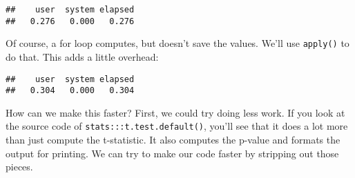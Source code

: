 \begin{verbatim}
##    user  system elapsed 
##   0.276   0.000   0.276
\end{verbatim}

Of course, a for loop computes, but doesn't save the values. We'll use
\texttt{apply()} to do that. This adds a little overhead:

\begin{Shaded}
\begin{Highlighting}[]
\StringTok{ }
  \NormalTok{(x[grp }\OperatorTok{==}\StringTok{ }\NormalTok{], x[grp }\OperatorTok{==}\StringTok{ }\NormalTok{])}\OperatorTok{$}
\NormalTok{\}}
\StringTok{ }
\end{Highlighting}
\end{Shaded}

\begin{verbatim}
##    user  system elapsed 
##   0.304   0.000   0.304
\end{verbatim}

How can we make this faster? First, we could try doing less work. If you
look at the source code of \texttt{stats:::t.test.default()}, you'll see
that it does a lot more than just compute the t-statistic. It also
computes the p-value and formats the output for printing. We can try to
make our code faster by stripping out those pieces.

